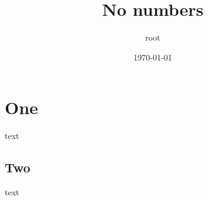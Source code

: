 \documentclass[11pt]{article}
\author{root}
\date{\today}
\title{No numbers}
\begin{document}
\maketitle
\section*{One}
\label{sec:orgd5c3c46}
text
\subsection*{Two}
\label{sec:org5017f09}
text
\end{document}
